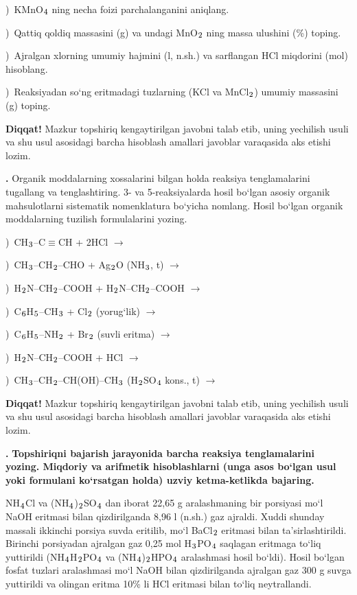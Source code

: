 \documentclass[11pt,a4paper]{article}
\renewcommand{\textsubscript}[1]{\ensuremath{_{\text{\fontsize{8}{8}\selectfont #1}}}}
\newcommand{\qn}[1]{\textbf{\fontsize{11.5}{13}\selectfont #1}}
\newcommand{\qsep}{\par\vspace{13pt}}
\newcommand{\diqqat}[1]{\par\smallskip\noindent\textbf{Diqqat!} #1\par\medskip}
\begin{document}
)\ KMnO\textsubscript{4} ning necha foizi parchalanganini aniqlang.\par
{})\ Qattiq qoldiq massasini (g) va undagi MnO\textsubscript{2} ning massa ulushini (\%) toping.\par
{})\ Ajralgan xlorning umumiy hajmini (l, n.sh.) va sarflangan HCl miqdorini (mol) hisoblang.\par
{})\ Reaksiyadan so`ng eritmadagi tuzlarning (KCl va MnCl\textsubscript{2}) umumiy massasini (g) toping.\par
\diqqat{Mazkur topshiriq kengaytirilgan javobni talab etib, uning yechilish usuli va shu usul asosidagi barcha hisoblash amallari javoblar varaqasida aks etishi lozim.}\qsep
\noindent\qn{42.} Organik moddalarning xossalarini bilgan holda reaksiya tenglamalarini tugallang va tenglashtiring. 3- va 5-reaksiyalarda hosil bo`lgan asosiy organik mahsulotlarni sistematik nomenklatura bo`yicha nomlang. Hosil bo`lgan organik moddalarning tuzilish formulalarini yozing.\par
{})\ CH\textsubscript{3}--C$\equiv$CH + 2HCl $\to$\par
{})\ CH\textsubscript{3}--CH\textsubscript{2}--CHO + Ag\textsubscript{2}O (NH\textsubscript{3}, t) $\to$\par
{})\ H\textsubscript{2}N--CH\textsubscript{2}--COOH + H\textsubscript{2}N--CH\textsubscript{2}--COOH $\to$\par
{})\ C\textsubscript{6}H\textsubscript{5}--CH\textsubscript{3} + Cl\textsubscript{2} (yorug`lik) $\to$\par
{})\ C\textsubscript{6}H\textsubscript{5}--NH\textsubscript{2} + Br\textsubscript{2} (suvli eritma) $\to$\par
{})\ H\textsubscript{2}N--CH\textsubscript{2}--COOH + HCl $\to$\par
{})\ CH\textsubscript{3}--CH\textsubscript{2}--CH(OH)--CH\textsubscript{3} (H\textsubscript{2}SO\textsubscript{4} kons., t) $\to$\par
\diqqat{Mazkur topshiriq kengaytirilgan javobni talab etib, uning yechilish usuli va shu usul asosidagi barcha hisoblash amallari javoblar varaqasida aks etishi lozim.}\qsep
\noindent\qn{43.} \textbf{Topshiriqni bajarish jarayonida barcha reaksiya tenglamalarini yozing. Miqdoriy va arifmetik hisoblashlarni (unga asos bo`lgan usul yoki formulani ko`rsatgan holda) uzviy ketma-ketlikda bajaring.}\par\smallskip
NH\textsubscript{4}Cl va (NH\textsubscript{4})\textsubscript{2}SO\textsubscript{4} dan iborat 22,65 g aralashmaning bir porsiyasi mo`l NaOH eritmasi bilan qizdirilganda 8,96 l (n.sh.) gaz ajraldi. Xuddi shunday massali ikkinchi porsiya suvda eritilib, mo`l BaCl\textsubscript{2} eritmasi bilan ta'sirlashtirildi. Birinchi porsiyadan ajralgan gaz 0,25 mol H\textsubscript{3}PO\textsubscript{4} saqlagan eritmaga to`liq yuttirildi (NH\textsubscript{4}H\textsubscript{2}PO\textsubscript{4} va (NH\textsubscript{4})\textsubscript{2}HPO\textsubscript{4} aralashmasi hosil bo`ldi). Hosil bo`lgan fosfat tuzlari aralashmasi mo`l NaOH bilan qizdirilganda ajralgan gaz 300 g suvga yuttirildi va olingan eritma 10\% li HCl eritmasi bilan to`liq neytrallandi.\par
\end{document}

